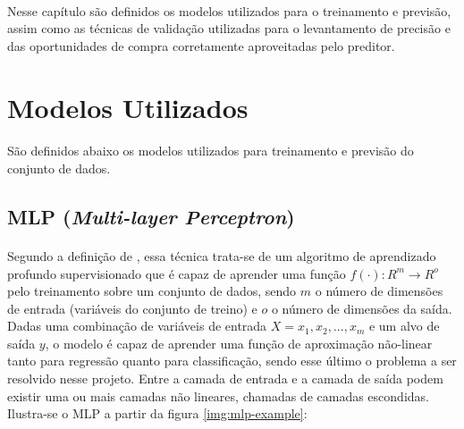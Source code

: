 \documentclass[grad,numbers]{coppe}
\begin{document}
        \paragraph{}Nesse capítulo são definidos os modelos utilizados para o treinamento e previsão, assim como as técnicas de validação utilizadas para o levantamento de precisão e das oportunidades de compra corretamente aproveitadas pelo preditor.
        
        \section{Modelos Utilizados}\label{sec:models}
        
            \paragraph{}São definidos abaixo os modelos utilizados para treinamento e previsão do conjunto de dados.
        
            \subsection{MLP (\textit{Multi-layer Perceptron})}
            
                \paragraph{}Segundo a definição de \citet{scikit-learn}, essa técnica trata-se de um algoritmo de aprendizado profundo supervisionado que é capaz de aprender uma função $f(\cdot) : R^m \xrightarrow{}R^o$ pelo treinamento sobre um conjunto de dados, sendo $m$ o número de dimensões de entrada (variáveis do conjunto de treino) e $o$ o número de dimensões da saída. Dadas uma combinação de variáveis de entrada $X = x_1, x_2, ..., x_m$ e um alvo de saída $y$, o modelo é capaz de aprender uma função de aproximação não-linear tanto para regressão quanto para classificação, sendo esse último o problema a ser resolvido nesse projeto. Entre a camada de entrada e a camada de saída podem existir uma ou mais camadas não lineares, chamadas de camadas escondidas. Ilustra-se o MLP a partir da figura \ref{img:mlp-example}:
                
\end{document}

